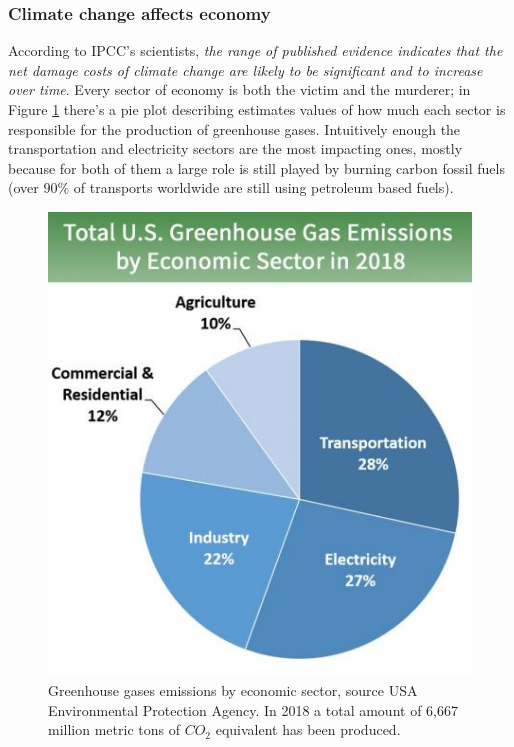 \documentclass[11pt,a4paper,titlepage]{book}
\begin{document}
\subsubsection{Climate change affects economy}
According to IPCC's scientists, \textit{the range of published evidence indicates that the net damage costs of climate change are likely to be significant and to increase over time}.
\newline
\newline
Every sector of economy is both the victim and the murderer; in Figure \ref{epa_source_gases} there's a pie plot describing estimates values of how much each sector is responsible for the production of greenhouse gases. Intuitively enough the transportation and electricity sectors are the most impacting ones, mostly because for both of them a large role is still played by burning carbon fossil fuels (over $90\%$ of transports worldwide are still using petroleum based fuels).
\begin{figure}[ht]
    \includegraphics[scale=0.60]{imgs/ch_1/epa_source_gases.jpg}
    \centering
    \caption{Greenhouse gases emissions by economic sector, source USA Environmental Protection Agency. In 2018 a total amount of 6,667 million metric tons of $CO_2$ equivalent has been produced.}
    \label{epa_source_gases}
\end{figure}
\newline
\end{document}
